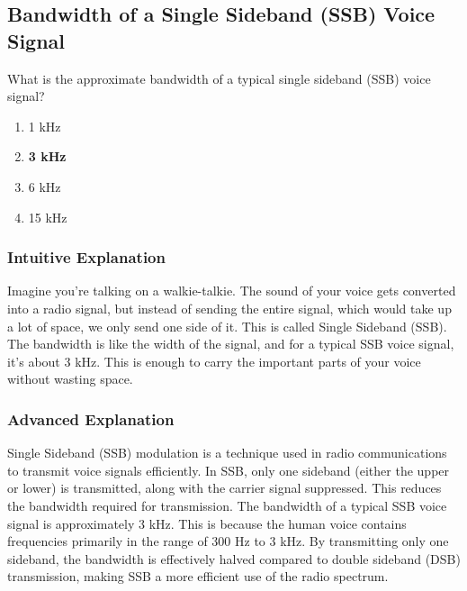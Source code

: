 \subsection{Bandwidth of a Single Sideband (SSB) Voice Signal}
\label{T8A08}

\begin{tcolorbox}[colback=gray!10!white,colframe=black!75!black,title=T8A08]
What is the approximate bandwidth of a typical single sideband (SSB) voice signal?
\begin{enumerate}[noitemsep]
    \item 1 kHz
    \item \textbf{3 kHz}
    \item 6 kHz
    \item 15 kHz
\end{enumerate}
\end{tcolorbox}

\subsubsection*{Intuitive Explanation}
Imagine you're talking on a walkie-talkie. The sound of your voice gets converted into a radio signal, but instead of sending the entire signal, which would take up a lot of space, we only send one side of it. This is called Single Sideband (SSB). The bandwidth is like the width of the signal, and for a typical SSB voice signal, it's about 3 kHz. This is enough to carry the important parts of your voice without wasting space.

\subsubsection*{Advanced Explanation}
Single Sideband (SSB) modulation is a technique used in radio communications to transmit voice signals efficiently. In SSB, only one sideband (either the upper or lower) is transmitted, along with the carrier signal suppressed. This reduces the bandwidth required for transmission. The bandwidth of a typical SSB voice signal is approximately 3 kHz. This is because the human voice contains frequencies primarily in the range of 300 Hz to 3 kHz. By transmitting only one sideband, the bandwidth is effectively halved compared to double sideband (DSB) transmission, making SSB a more efficient use of the radio spectrum.

